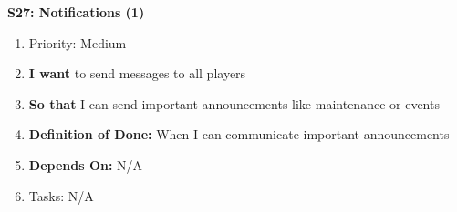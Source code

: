 \textbf{S27: Notifications (1)}
\begin{enumerate}
    \item Priority: Medium
    \item \textbf{I want} to send messages to all players
    \item \textbf{So that} I can send important announcements like maintenance or events
    \item \textbf{Definition of Done:} When I can communicate important announcements
    \item \textbf{Depends On:} N/A
    \item Tasks: N/A
\end{enumerate}



